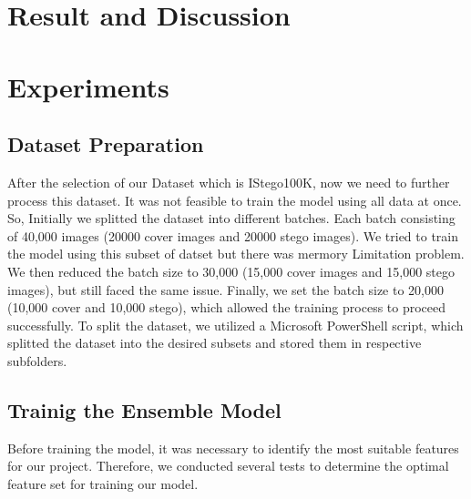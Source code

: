 \chapter{Result and Discussion}
\chapter{Experiments}
\section{Dataset Preparation}
After the selection of our Dataset which is IStego100K\cite{7}, now we need to further process this dataset. It was not feasible to train the model using all data at once. So, Initially we splitted the dataset into different batches. Each batch consisting of 40,000 images (20000 cover images and 20000 stego images). We tried to train the model using this subset of datset but there was mermory Limitation problem. We then reduced the batch size to 30,000 (15,000 cover images and 15,000 stego images), but still faced the same issue. Finally, we set the batch size to 20,000 (10,000 cover and 10,000 stego), which allowed the training process to proceed successfully. To split the dataset, we utilized a Microsoft PowerShell script, which splitted the dataset into the desired subsets and stored them in respective subfolders.

\section{Trainig the Ensemble Model}
Before training the model, it was necessary to identify the most suitable features for our project. Therefore, we conducted several tests to determine the optimal feature set for training our model.
